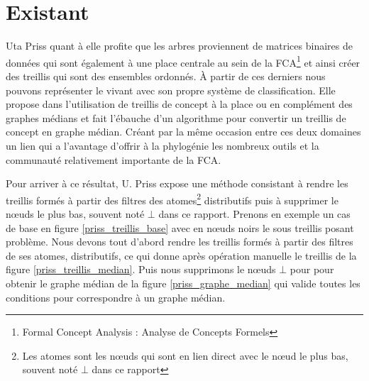 \chapter{Existant}

Uta Priss quant à elle profite que les arbres proviennent de matrices binaires de données qui sont également à une place centrale au sein de la FCA\footnote{Formal Concept Analysis : Analyse de Concepts Formels} et ainsi créer des treillis qui sont des ensembles ordonnés. À partir de ces derniers nous pouvons représenter le vivant avec son propre système de classification. Elle propose dans \cite{MedianConceptLattices} l'utilisation de treillis de concept à la place ou en complément des graphes médians et fait l'ébauche d'un algorithme pour convertir un treillis de concept en graphe médian. Créant par la même occasion entre ces deux domaines un lien qui a l'avantage d'offrir à la phylogénie les nombreux outils et la communauté relativement importante de la FCA.

\bigbreak

Pour arriver à ce résultat, U. Priss expose une méthode consistant à rendre les treillis formés à partir des filtres des atomes\footnote{Les atomes sont les n\oe uds qui sont en lien direct avec le n\oe ud le plus bas, souvent noté $\bot$ dans ce rapport} distributifs puis à supprimer le n\oe uds le plus bas, souvent noté $\bot$ dans ce rapport. Prenons en exemple un cas de base en figure \ref{priss_treillis_base} avec en n\oe uds noirs le sous treillis posant problème. Nous devons tout d'abord rendre les treillis formés à partir des filtres de ses atomes, distributifs, ce qui donne après opération manuelle le treillis de la figure \ref{priss_treillis_median}. Puis nous supprimons le n\oe uds $\bot$ pour pour obtenir le graphe médian de la figure \ref{priss_graphe_median} qui valide toutes les conditions pour correspondre à un graphe médian.

